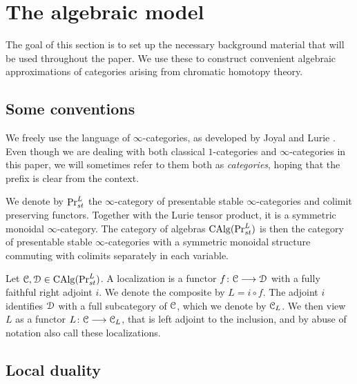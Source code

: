 
\section{The algebraic model}

The goal of this section is to set up the necessary background material that will be used throughout the paper. We use these to construct convenient algebraic approximations of categories arising from chromatic homotopy theory. 

\subsection*{Some conventions}

We freely use the language of $\infty$-categories, as developed by Joyal \cite{joyal_02} and Lurie \cite{lurie_09, Lurie_HA}. Even though we are dealing with both classical $1$-categories and $\infty$-categories in this paper, we will sometimes refer to them both as \emph{categories}, hoping that the prefix is clear from the context. 

We denote by $\mathrm{Pr}_{st}^L$ the $\infty$-category of presentable stable $\infty$-categories and colimit preserving functors. Together with the Lurie tensor product, it is a symmetric monoidal $\infty$-category. The category of algebras $\operatorname{CAlg}(\mathrm{Pr}_{st}^L)$ is then the category of presentable stable $\infty$-categories with a symmetric monoidal structure commuting with colimits separately in each variable. 

Let $\EuScript{C}, \EuScript{D}\in \operatorname{CAlg}(\mathrm{Pr}_{st}^L)$. A localization is a functor $f\colon \EuScript{C}\longrightarrow \EuScript{D}$ with a fully faithful right adjoint $i$. We denote the composite by $L= i\circ f$. The adjoint $i$ identifies $\EuScript{D}$ with a full subcategory of $\EuScript{C}$, which we denote by $\EuScript{C}_L$. We then view $L$ as a functor $L\colon \EuScript{C}\longrightarrow\EuScript{C}_L$, that is left adjoint to the inclusion, and by abuse of notation also call these localizations. 



















\subsection{Local duality}

